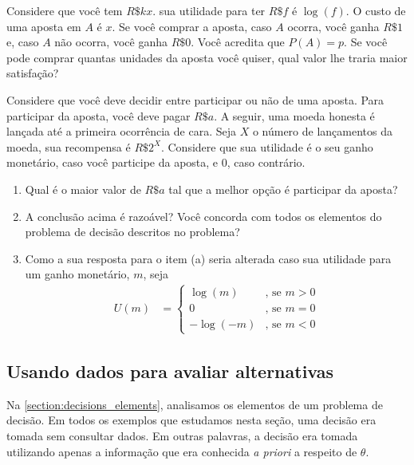\begin{exercise}
 Considere que você tem $R\$kx$.
 sua utilidade para ter $R\$f$ é $\log(f)$.
 O custo de uma aposta em $A$ é $x$.
 Se você comprar a aposta,
 caso $A$ ocorra, você ganha $R\$1$ e,
 caso $A$ não ocorra, você ganha $R\$0$.
 Você acredita que $P(A) = p$.
 Se você pode comprar quantas unidades da
 aposta você quiser, qual valor
 lhe traria maior satisfação?
\end{exercise}

\begin{exercise}
 Considere que você deve decidir entre
 participar ou não de uma aposta.
 Para participar da aposta, 
 você deve pagar $R\$a$.
 A seguir, uma moeda honesta é lançada até a
 primeira ocorrência de cara. Seja $X$ o
 número de lançamentos da moeda,
 sua recompensa é $R\$2^{X}$.
 Considere que sua utilidade é o seu ganho monetário,
 caso você participe da aposta, e $0$, caso contrário.
 \begin{enumerate}[label=(\alph*)]
  \item Qual é o maior valor de $R\$a$ tal que
  a melhor opção é participar da aposta?
  \item A conclusão acima é razoável?
  Você concorda com todos os elementos
  do problema de decisão descritos no problema?
  \item Como a sua resposta para o item (a) seria
  alterada caso sua utilidade para
  um ganho monetário, $m$, seja
  \begin{align*}
   U(m)	&=
   \begin{cases}
    \log(m) & \text{, se $m > 0$} \\
    0 & \text{, se $m = 0$} \\
    -\log(-m) & \text{, se $m < 0$}
   \end{cases}
  \end{align*}
 \end{enumerate}
\end{exercise}

\subsection{Usando dados para avaliar alternativas}

Na \cref{section:decisions_elements},
analisamos os elementos de um problema de decisão.
Em todos os exemplos que estudamos nesta seção,
uma decisão era tomada sem consultar dados.
Em outras palavras, a decisão era tomada utilizando
apenas a informação que era conhecida \emph{a priori}
a respeito de $\theta$.

